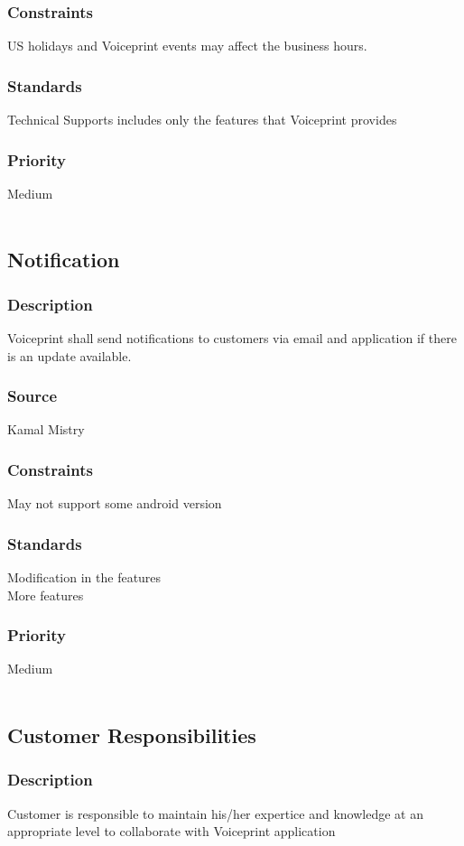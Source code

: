 \subsubsection{Constraints}
US holidays and Voiceprint events may affect the business hours.
\subsubsection{Standards}
Technical Supports includes only the features that Voiceprint provides
\subsubsection{Priority}
Medium
\\
\\
\subsection{Notification}
\subsubsection{Description}
Voiceprint shall send notifications to customers via email and application if there is an update available.
\subsubsection{Source}
Kamal Mistry
\subsubsection{Constraints}
May not support some android version
\subsubsection{Standards}
Modification in the features \\
More features 
\subsubsection{Priority}
Medium
\\
\\
\subsection{Customer Responsibilities}
\subsubsection{Description}
Customer is responsible to maintain his/her expertice and knowledge at an appropriate level to collaborate with Voiceprint application
